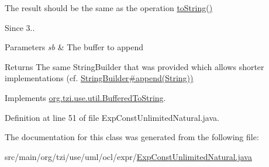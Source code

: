 The result should be the same as the operation \hyperlink{classorg_1_1tzi_1_1use_1_1uml_1_1ocl_1_1expr_1_1_expression_a01192513b1b1adbc44727a67ae14d02e}{to\-String()} 

\begin{DoxySince}{Since}
3.. 
\end{DoxySince}

\begin{DoxyParams}{Parameters}
{\em sb} & The buffer to append \\
\hline
\end{DoxyParams}
\begin{DoxyReturn}{Returns}
The same String\-Builder that was provided which allows shorter implementations (cf. \hyperlink{}{String\-Builder\#append(\-String))} 
\end{DoxyReturn}


Implements \hyperlink{interfaceorg_1_1tzi_1_1use_1_1util_1_1_buffered_to_string_aea95e4e53b18818d50ee253700e6e2d5}{org.\-tzi.\-use.\-util.\-Buffered\-To\-String}.



Definition at line 51 of file Exp\-Const\-Unlimited\-Natural.\-java.



The documentation for this class was generated from the following file\-:\begin{DoxyCompactItemize}
\item 
src/main/org/tzi/use/uml/ocl/expr/\hyperlink{_exp_const_unlimited_natural_8java}{Exp\-Const\-Unlimited\-Natural.\-java}\end{DoxyCompactItemize}

